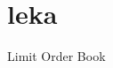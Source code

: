 \chapter{leka }
\hypertarget{md__r_e_a_d_m_e}{}\label{md__r_e_a_d_m_e}
\label{md__r_e_a_d_m_e_autotoc_md0}%
%


Limit Order Book 